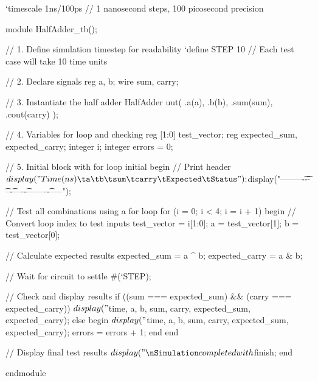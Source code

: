 \documentclass[12pt]{labmanual}
\begin{document}
\begin{codeblock}[language=verilog]
`timescale 1ns/100ps    // 1 nanosecond steps, 100 picosecond precision

module HalfAdder_tb();

// 1. Define simulation timestep for readability
`define STEP 10    // Each test case will take 10 time units

// 2. Declare signals
reg a, b;           
wire sum, carry;    

// 3. Instantiate the half adder
HalfAdder uut(
    .a(a),
    .b(b),
    .sum(sum),
    .cout(carry)
);

// 4. Variables for loop and checking
reg [1:0] test_vector;
reg expected_sum, expected_carry;
integer i;
integer errors = 0;

// 5. Initial block with for loop
initial begin
    // Print header
    $display("Time(ns)\ta\tb\tsum\tcarry\tExpected\tStatus");
    $display("--------\t-\t-\t---\t-----\t--------\t------");
    
    // Test all combinations using a for loop
    for (i = 0; i < 4; i = i + 1) begin
        // Convert loop index to test inputs
        test_vector = i[1:0];
        a = test_vector[1];
        b = test_vector[0];
        
        // Calculate expected results
        expected_sum = a ^ b;
        expected_carry = a & b;
        
        // Wait for circuit to settle
        #(`STEP);
        
        // Check and display results
        if ((sum === expected_sum) && (carry === expected_carry))
            $display("%
                    $time, a, b, sum, carry, expected_sum, expected_carry);
        else begin
            $display("%
                    $time, a, b, sum, carry, expected_sum, expected_carry);
            errors = errors + 1;
        end
    end
    
    // Display final test results
    $display("\nSimulation completed with %
    $finish;
end

endmodule
\end{codeblock}
\end{document}
